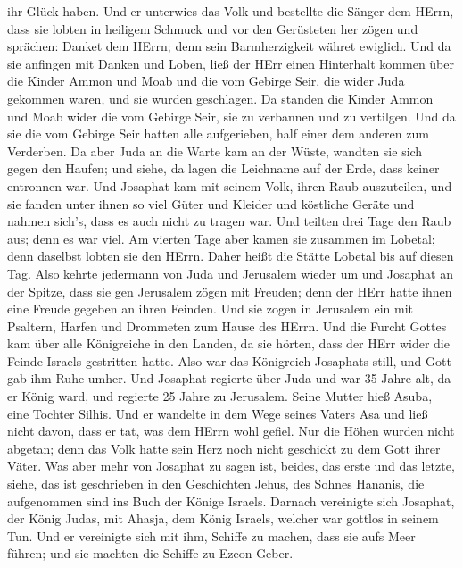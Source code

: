 ihr Glück haben.  Und er unterwies das Volk und bestellte
die Sänger dem HErrn, dass sie lobten in heiligem Schmuck und vor den
Gerüsteten her zögen und sprächen: Danket dem HErrn; denn sein
Barmherzigkeit währet ewiglich.  Und da sie anfingen mit
Danken und Loben, ließ der HErr einen Hinterhalt kommen über die Kinder
Ammon und Moab und die vom Gebirge Seir, die wider Juda gekommen waren,
und sie wurden geschlagen.  Da standen die Kinder Ammon und
Moab wider die vom Gebirge Seir, sie zu verbannen und zu vertilgen. Und
da sie die vom Gebirge Seir hatten alle aufgerieben, half einer dem
anderen zum Verderben.  Da aber Juda an die Warte kam an
der Wüste, wandten sie sich gegen den Haufen; und siehe, da lagen die
Leichname auf der Erde, dass keiner entronnen war.  Und
Josaphat kam mit seinem Volk, ihren Raub auszuteilen, und sie fanden
unter ihnen so viel Güter und Kleider und köstliche Geräte und nahmen
sich's, dass es auch nicht zu tragen war. Und teilten drei Tage den Raub
aus; denn es war viel.  Am vierten Tage aber kamen sie
zusammen im Lobetal; denn daselbst lobten sie den HErrn. Daher heißt die
Stätte Lobetal bis auf diesen Tag.  Also kehrte jedermann
von Juda und Jerusalem wieder um und Josaphat an der Spitze, dass sie
gen Jerusalem zögen mit Freuden; denn der HErr hatte ihnen eine Freude
gegeben an ihren Feinden.  Und sie zogen in Jerusalem ein
mit Psaltern, Harfen und Drommeten zum Hause des HErrn. 
Und die Furcht Gottes kam über alle Königreiche in den Landen, da sie
hörten, dass der HErr wider die Feinde Israels gestritten hatte.
 Also war das Königreich Josaphats still, und Gott gab ihm
Ruhe umher.  Und Josaphat regierte über Juda und war 35
Jahre alt, da er König ward, und regierte 25 Jahre zu Jerusalem. Seine
Mutter hieß Asuba, eine Tochter Silhis.  Und er wandelte in
dem Wege seines Vaters Asa und ließ nicht davon, dass er tat, was dem
HErrn wohl gefiel.  Nur die Höhen wurden nicht abgetan;
denn das Volk hatte sein Herz noch nicht geschickt zu dem Gott ihrer
Väter.  Was aber mehr von Josaphat zu sagen ist, beides,
das erste und das letzte, siehe, das ist geschrieben in den Geschichten
Jehus, des Sohnes Hananis, die aufgenommen sind ins Buch der Könige
Israels.  Darnach vereinigte sich Josaphat, der König
Judas, mit Ahasja, dem König Israels, welcher war gottlos in seinem Tun.
 Und er vereinigte sich mit ihm, Schiffe zu machen, dass
sie aufs Meer führen; und sie machten die Schiffe zu Ezeon-Geber.
